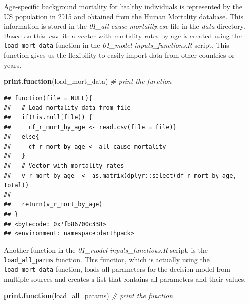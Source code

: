 \documentclass[]{book}
\newenvironment{Shaded}{\begin{snugshade}}{\end{snugshade}}
\newcommand{\KeywordTok}[1]{\textcolor[rgb]{0.13,0.29,0.53}{\textbf{#1}}}
\newcommand{\CommentTok}[1]{\textcolor[rgb]{0.56,0.35,0.01}{\textit{#1}}}
\newcommand{\NormalTok}[1]{#1}
\begin{document}
Age-specific background mortality for healthy individuals is represented
by the US population in 2015 and obtained from the
\href{https://www.mortality.org}{Human Mortality database}. This
information is stored in the \emph{01\_all-cause-mortality.csv} file in
the \emph{data} directory. Based on this .csv file a vector with
mortality rates by age is created using the \texttt{load\_mort\_data}
function in the \emph{01\_model-inputs\_functions.R} script. This
function gives us the flexibility to easily import data from other
countries or years.

\begin{Shaded}
\begin{Highlighting}[]
\KeywordTok{print.function}\NormalTok{(load_mort_data) }\CommentTok{# print the function}
\end{Highlighting}
\end{Shaded}

\begin{verbatim}
## function(file = NULL){
##   # Load mortality data from file
##   if(!is.null(file)) {
##     df_r_mort_by_age <- read.csv(file = file)}
##   else{
##     df_r_mort_by_age <- all_cause_mortality
##   }
##   # Vector with mortality rates
##   v_r_mort_by_age  <- as.matrix(dplyr::select(df_r_mort_by_age, Total))
##   
##   return(v_r_mort_by_age)
## }
## <bytecode: 0x7fb86700c338>
## <environment: namespace:darthpack>
\end{verbatim}

Another function in the \emph{01\_model-inputs\_functions.R} script, is
the \texttt{load\_all\_parms} function. This function, which is actually
using the \texttt{load\_mort\_data} function, loads all parameters for
the decision model from multiple sources and creates a list that
contains all parameters and their values.

\begin{Shaded}
\begin{Highlighting}[]
\KeywordTok{print.function}\NormalTok{(load_all_params)  }\CommentTok{# print the function}
\end{Highlighting}
\end{Shaded}
\end{document}
